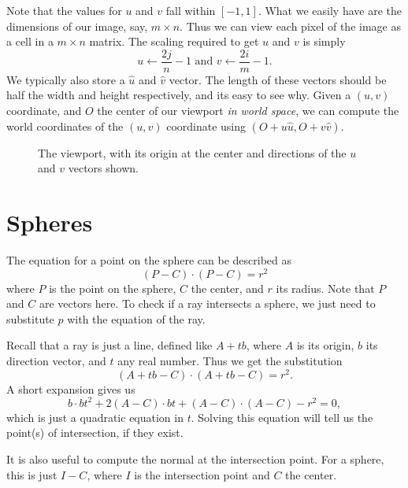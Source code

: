 \documentclass{scrartcl}
\begin{document}
Note that the values for $u$ and $v$ fall within $[-1,1]$.
What we easily have are the dimensions of our image, say, $m \times n$.
Thus we can view each pixel of the image as a cell in a $m \times n$ matrix.
The scaling required to get $u$ and $v$ is simply
\[
u \gets \frac{2j}{n} - 1 \text{ and } v \gets \frac{2i}{m} - 1.
\]
We typically also store a $\hat u$ and $\hat v$ vector.
The length of these vectors should be half the width and height respectively, and its easy to see why.
Given a $(u,v)$ coordinate, and $O$ the center of our viewport \emph{in world space}, we can compute the world coordinates of the $(u,v)$ coordinate using $(O+u\hat u, O + v\hat v)$.

\begin{figure}
\centering
{}
\caption{The viewport, with its origin at the center and directions of the $u$ and $v$ vectors shown.}
\label{fig:uv-coord}
\end{figure}

\section{Spheres}

The equation for a point on the sphere can be described as
\[
(P-C)\cdot(P-C) = r^2
\]
where $P$ is the point on the sphere, $C$ the center, and $r$ its radius.
Note that $P$ and $C$ are vectors here.
To check if a ray intersects a sphere, we just need to substitute $p$ with the equation of the ray.

Recall that a ray is just a line, defined like $A+tb$, where $A$ is its origin, $b$ its direction vector, and $t$ any real number.
Thus we get the substitution
\[
(A+tb-C)\cdot(A+tb-C) = r^2.
\]
A short expansion gives us
\[
b\cdot b t^2 + 2(A-C)\cdot b t + (A-C)\cdot (A-C) - r^2 = 0,
\]
which is just a quadratic equation in $t$.
Solving this equation will tell us the point(s) of intersection, if they exist.

\begin{mdframed}
It is also useful to compute the normal at the intersection point.
For a sphere, this is just $I - C$, where $I$ is the intersection point and $C$ the center.
\end{mdframed}
\end{document}
